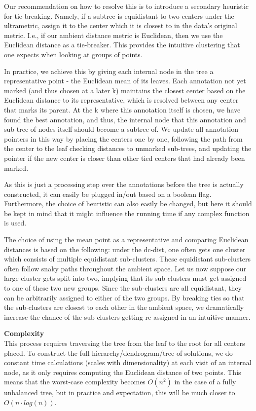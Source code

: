 Our recommendation on how to resolve this is to introduce a secondary heuristic for tie-breaking. Namely, if a subtree is equidistant to two centers under the ultrametric, assign it to the center which it is closest to in the data's original metric. I.e., if our ambient distance metric is Euclidean, then we use the Euclidean distance as a tie-breaker. This provides the intuitive clustering that one expects when looking at groups of points.

In practice, we achieve this by giving each internal node in the tree a representative point - the Euclidean mean of its leaves. Each annotation not yet marked (and thus chosen at a later k) maintains the closest center based on the Euclidean distance to its representative, which is resolved between any center that marks its parent. At the k where this annotation itself is chosen, we have found the best annotation, and thus, the internal node that this annotation and sub-tree of nodes itself should become a subtree of. We update all annotation pointers in this way by placing the centers one by one, following the path from the center to the leaf checking distances to unmarked sub-trees, and updating the pointer if the new center is closer than other tied centers that had already been marked. 

As this is just a processing step over the annotations before the tree is actually constructed, it can easily be plugged in/out based on a boolean flag. Furthermore, the choice of heuristic can also easily be changed, but here it should be kept in mind that it might influence the running time if any complex function is used. 

The choice of using the mean point as a representative and comparing Euclidean distances is based on the following: under the dc-dist, one often gets one cluster which consists of multiple equidistant sub-clusters. These equidistant sub-clusters often follow snaky paths throughout the ambient space. Let us now suppose our large cluster gets split into two, implying that its sub-clusters must get assigned to one of these two new groups. Since the sub-clusters are all equidistant, they can be arbitrarily assigned to either of the two groups. By breaking ties so that the sub-clusters are closest to each other in the ambient space, we dramatically increase the chance of the sub-clusters getting re-assigned in an intuitive manner.

\textbf{Complexity}\\
This process requires traversing the tree from the leaf to the root for all centers placed. To construct the full hierarchy/dendrogram/tree of solutions, we do constant time calculations (scales with dimensionality) at each visit of an internal node, as it only requires computing the Euclidean distance of two points. This means that the worst-case complexity becomes $O(n^2)$ in the case of a fully unbalanced tree, but in practice and expectation, this will be much closer to $O(n \cdot log(n))$.




